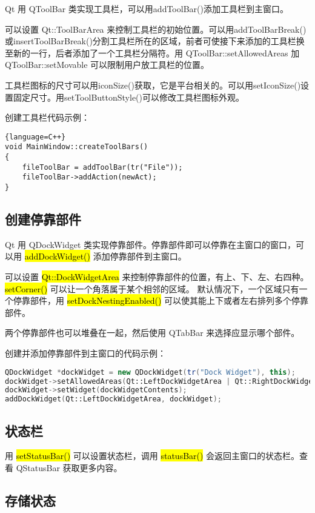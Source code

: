 Qt 用 QToolBar 类实现工具栏，可以用addToolBar()添加工具栏到主窗口。

可以设置 Qt::ToolBarArea 来控制工具栏的初始位置。可以用addToolBarBreak()或insertToolBarBreak()分割工具栏所在的区域，前者可使接下来添加的工具栏换至新的一行，后者添加了一个工具栏分隔符。用 QToolBar::setAllowedAreas 加 QToolBar::setMovable 可以限制用户放工具栏的位置。

工具栏图标的尺寸可以用iconSize()获取，它是平台相关的。可以用setIconSize()设置固定尺寸。用setToolButtonStyle()可以修改工具栏图标外观。

创建工具栏代码示例：

\begin{lstlisting}{language=C++}
void MainWindow::createToolBars()
{
    fileToolBar = addToolBar(tr("File"));
    fileToolBar->addAction(newAct);
}
\end{lstlisting}

\subsection{创建停靠部件}

Qt 用 QDockWidget 类实现停靠部件。停靠部件即可以停靠在主窗口的窗口，可以用 \hl{addDockWidget()} 添加停靠部件到主窗口。

可以设置 \hl{Qt::DockWidgetArea} 来控制停靠部件的位置，有上、下、左、右四种。\hl{setCorner()} 可以让一个角落属于某个相邻的区域。
默认情况下，一个区域只有一个停靠部件，用 \hl{setDockNestingEnabled()} 可以使其能上下或者左右排列多个停靠部件。

两个停靠部件也可以堆叠在一起，然后使用 QTabBar 来选择应显示哪个部件。

创建并添加停靠部件到主窗口的代码示例：


\begin{lstlisting}[language=C++]
QDockWidget *dockWidget = new QDockWidget(tr("Dock Widget"), this);
dockWidget->setAllowedAreas(Qt::LeftDockWidgetArea | Qt::RightDockWidgetArea);
dockWidget->setWidget(dockWidgetContents);
addDockWidget(Qt::LeftDockWidgetArea, dockWidget);
\end{lstlisting}

\subsection{状态栏}

用 \hl{setStatusBar()} 可以设置状态栏，调用 \hl{statusBar()} 会返回主窗口的状态栏。查看 QStatusBar 获取更多内容。

\subsection{存储状态}

